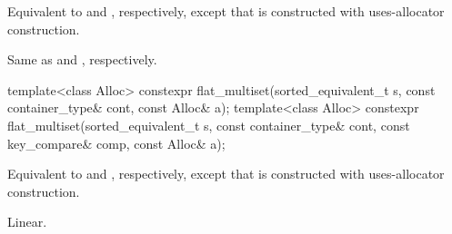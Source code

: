 \begin{itemdescr}
\pnum
\effects
Equivalent to  and
, respectively,
except that  is constructed with
uses-allocator construction.

\pnum
\complexity
Same as  and
, respectively.
\end{itemdescr}

%
\begin{itemdecl}
template<class Alloc>
  constexpr flat_multiset(sorted_equivalent_t s, const container_type& cont, const Alloc& a);
template<class Alloc>
  constexpr flat_multiset(sorted_equivalent_t s, const container_type& cont,
                          const key_compare& comp, const Alloc& a);
\end{itemdecl}

\begin{itemdescr}
\pnum
\effects
Equivalent to  and
, respectively,
except that  is constructed with
uses-allocator construction.

\pnum
\complexity
Linear.
\end{itemdescr}


